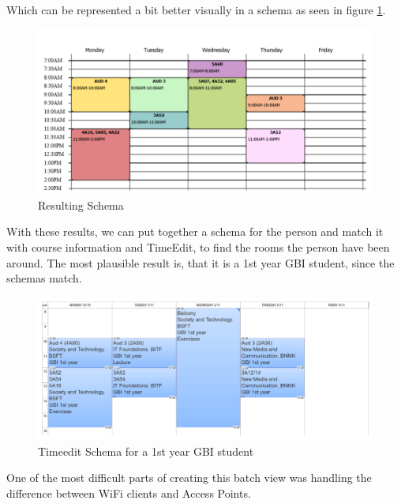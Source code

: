 Which can be represented a bit better visually in a schema as seen in figure \ref{fig:result_schema}.

\begin{figure}[p]
	\centering
	\includegraphics[width=\linewidth]{figures/schema-from-data.png}
	\caption{Resulting Schema}
	\label{fig:result_schema}
\end{figure}

With these results, we can put together a schema for the person and match it with course information and TimeEdit, to find the rooms the person have been around. The most plausible result is, that it is a 1st year GBI student, since the schemas match.

\begin{figure}[p]
	\centering
	\includegraphics[width=\linewidth]{figures/schema-from-timeedit.png}
	\caption{Timeedit Schema for a 1st year GBI student}
	\label{fig:timeedit_schema}
\end{figure}

One of the most difficult parts of creating this batch view was handling the difference between WiFi clients and Access Points. 
